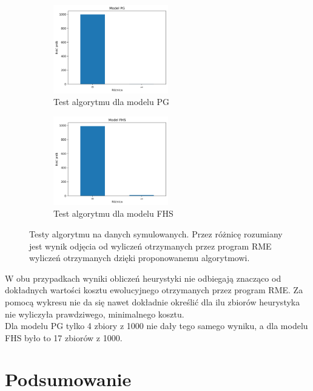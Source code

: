 \documentclass[licencjacka]{pracamgr}
\begin{document}
\begin{figure}[H]
\centering
\begin{subfigure}{.5\textwidth}
  \centering
  \includegraphics[width=50mm]{./pictures/PG.png}
  \caption{Test algorytmu dla modelu PG}
  \label{fig:sub2}
\end{subfigure}%
\begin{subfigure}{.5\textwidth}
  \centering
  \includegraphics[width=50mm]{./pictures/FHS.png}
  \caption{Test algorytmu dla modelu FHS}
  \label{fig:sub1}
\end{subfigure}%
\caption{Testy algorytmu na danych symulowanych. Przez różnicę rozumiany jest wynik odjęcia od wyliczeń otrzymanych przez program RME wyliczeń otrzymanych dzięki proponowanemu algorytmowi. }
\label{fig:test}
\end{figure}

W obu przypadkach wyniki obliczeń heurystyki nie odbiegają znacząco od dokładnych wartości kosztu ewolucyjnego otrzymanych przez program RME. Za pomocą wykresu nie da się nawet dokładnie określić dla ilu zbiorów heurystyka nie wyliczyła prawdziwego, minimalnego kosztu.\\
Dla modelu PG tylko 4 zbiory z 1000 nie dały tego samego wyniku, a dla modelu FHS było to 17 zbiorów z 1000.

\chapter{Podsumowanie}
\end{document}
